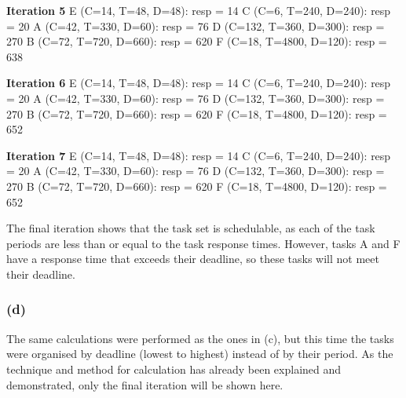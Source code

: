 \documentclass[]{report}
\begin{document}
			\textbf{Iteration 5} \newline
			E (C=14, T=48, D=48): resp = 14 \newline
			C (C=6, T=240, D=240): resp = 20 \newline
			A (C=42, T=330, D=60): resp = 76 \newline
			D (C=132, T=360, D=300): resp = 270 \newline
			B (C=72, T=720, D=660): resp = 620 \newline
			F (C=18, T=4800, D=120): resp = 638 \newline
	
			\textbf{Iteration 6} \newline
			E (C=14, T=48, D=48): resp = 14 \newline
			C (C=6, T=240, D=240): resp = 20 \newline
			A (C=42, T=330, D=60): resp = 76 \newline
			D (C=132, T=360, D=300): resp = 270 \newline
			B (C=72, T=720, D=660): resp = 620 \newline
			F (C=18, T=4800, D=120): resp = 652 \newline
	
			\textbf{Iteration 7} \newline
			E (C=14, T=48, D=48): resp = 14 \newline
			C (C=6, T=240, D=240): resp = 20 \newline
			A (C=42, T=330, D=60): resp = 76 \newline
			D (C=132, T=360, D=300): resp = 270 \newline
			B (C=72, T=720, D=660): resp = 620 \newline
			F (C=18, T=4800, D=120): resp = 652 \newline
			
			The final iteration shows that the task set is schedulable, as each of the task periods are less than or equal to the task response times. However, tasks A and F have a response time that exceeds their deadline, so these tasks will not meet their deadline.
			
			\subsubsection{(d)}
			The same calculations were performed as the ones in (c), but this time the tasks were organised by deadline (lowest to highest) instead of by their period. As the technique and method for calculation has already been explained and demonstrated, only the final iteration will be shown here.
			\medskip
\end{document}
